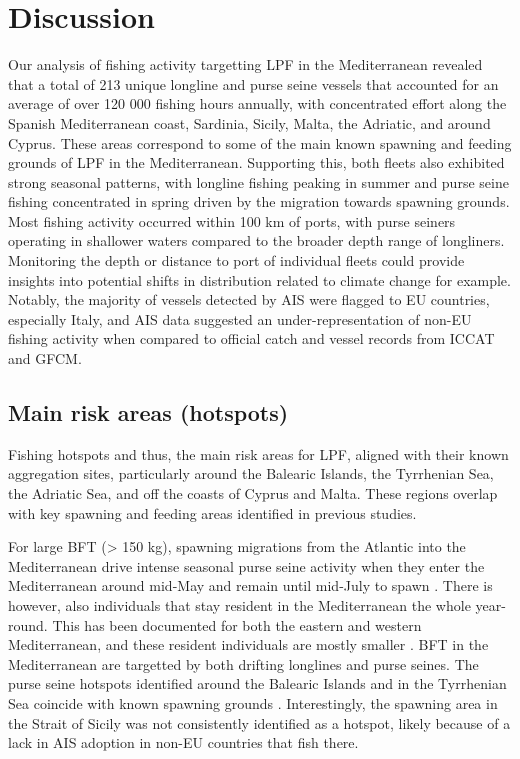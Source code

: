 \chapter{Discussion}
Our analysis of fishing activity targetting LPF in the Mediterranean revealed that a total of 213
unique longline and purse seine vessels that accounted for an average of over 120 000 fishing hours
annually, with concentrated effort along the Spanish Mediterranean coast, Sardinia, Sicily, Malta,
the Adriatic, and around Cyprus. These areas correspond to some of the main known spawning and
feeding grounds of LPF in the Mediterranean. Supporting this, both fleets also exhibited strong
seasonal patterns, with longline fishing peaking in summer and purse seine fishing concentrated in
spring driven by the migration towards spawning grounds. Most fishing activity occurred within 100
km of ports, with purse seiners operating in shallower waters compared to the broader depth range
of longliners. Monitoring the depth or distance to port of individual fleets could provide insights
into potential shifts in distribution related to climate change for example. Notably, the majority
of vessels detected by AIS were flagged to EU countries, especially Italy, and AIS data suggested
an under-representation of non-EU fishing activity when compared to official catch and vessel
records from ICCAT and GFCM.

\section{Main risk areas (hotspots)}
Fishing hotspots and thus, the main risk areas for LPF, aligned with their known aggregation sites,
particularly around the Balearic Islands, the Tyrrhenian Sea, the Adriatic Sea, and off the coasts
of Cyprus and Malta. These regions overlap with key spawning and feeding areas identified in
previous studies.

\medskip

For large BFT (> 150 kg), spawning migrations from the Atlantic into the Mediterranean drive
intense seasonal purse seine activity when they enter the Mediterranean around mid-May and remain
until mid-July to spawn \citep{bft_mig_med}. There is however, also individuals that stay resident
in the Mediterranean the whole year-round. This has been documented for both the eastern and
western Mediterranean, and these resident individuals are mostly smaller
\citep{cermeno_15_tagging,heinisch_08}. BFT in the Mediterranean are targetted by both drifting
longlines and purse seines. The purse seine hotspots identified around the Balearic Islands and in
the Tyrrhenian Sea coincide with known spawning grounds \citep{medina_spawning}. Interestingly, the
spawning area in the Strait of Sicily was not consistently identified as a hotspot, likely because
of a lack in AIS adoption in non-EU countries that fish there. \medskip

